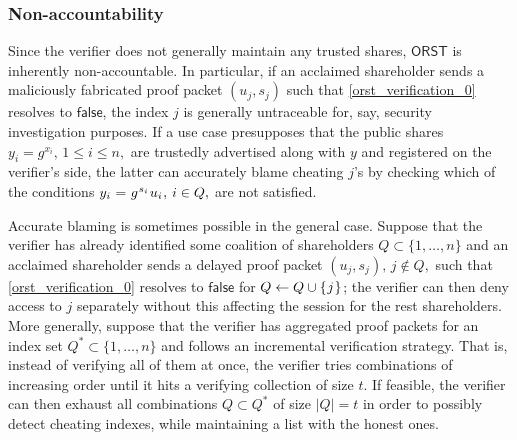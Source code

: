 \documentclass[10pt, psamsfonts, reqno]{amsart}
\theoremstyle{definition}
\theoremstyle{remark}
\numberwithin{equation}{section}
\begin{document}
\subsubsection{Non-accountability}\label{section_non_accountability}
Since the verifier does not generally
maintain any trusted shares,
$\mathsf{ORST}$ is inherently non-accountable.
In particular, if an acclaimed shareholder sends
a maliciously fabricated proof packet $(u_j, s_j)$
such that \eqref{orst_verification_0}
resolves to $\mathsf{false}$, the index $j$
is generally untraceable
for, say, security investigation purposes.
If a use case presupposes that the
public shares $y_i=g^{x_i},\hspace{2pt} 1 \le i \le n,$
are trustedly advertised along with $y$
and registered on the verifier's side,
the latter can accurately blame cheating $j$'s by
checking which of the conditions
$
y_i \hspace{0.5pt}
=
\hspace{0.5pt}
g^{\hspace{0.5pt}s_i}\hspace{0.5pt} u_i\hspace{0.5pt},
\hspace{2pt} i \in Q,
$
are not satisfied.

Accurate blaming is sometimes possible in the general case.
Suppose that the verifier has already
identified some coalition of shareholders
$Q \subset \{1, \dots, n\}$
and an acclaimed shareholder sends a delayed proof packet
$(u_j, s_j),\hspace{2pt} j \not \in Q,$ such that
\eqref{orst_verification_0}
resolves to $\mathsf{false}$
for $Q \leftarrow Q \cup \{\hspace{0.5pt}j\hspace{0.5pt}\}$;
the verifier can then deny access to $j$ separately
without this affecting the session for the rest shareholders.
More generally, suppose that the verifier has aggregated
proof packets for an index set $Q^* \subset \{1, \dots, n\}$
and follows an incremental verification strategy.
That is, instead of verifying all of them at once,
the verifier tries combinations of increasing order until
it hits a verifying collection of size $t$.
If feasible, the verifier can then exhaust all combinations
$Q \subset Q^*$ of size $|Q| = t$ in order
to possibly detect cheating indexes, while maintaining a list
with the honest ones.
\end{document}
